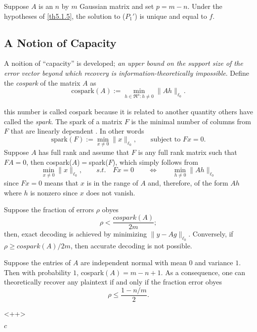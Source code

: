 \begin{corollary}
    \label{cr5.1.6}
    Suppose $A$ is an $n$ by $m$ Gaussian matrix and set $p = m-n$. Under the hypotheses of \cref{th5.1.5}, the solution to ($P_1'$) is unique and equal to $f$.
\end{corollary}

\subsection{A Notion of Capacity}
A noition of ``capacity'' is developed; \emph{\textcolor[rgb]{1,0,0}{an upper bound on the support size of the error vector beyond which recovery is information-theoretically impossible}}. Define the \emph{cospark} of the matrix $A$ as 
\begin{equation}
    \text{cospark}(A) := \min\limits_{h \in \mathfrak{R}^n : h \neq 0} \|Ah\|_{\ell_0}.
    \label{eq5.1.11}
\end{equation}

this number is called cospark because it is related to another quantity others have called the \emph{spark}. The spark of a matrix $F$ is the minimal number of columns from $F$ that are linearly dependent \cite{2-33,2-27}. In other words
\begin{equation*}
    \text{spark}(F) := \min\limits_{x \neq 0}\|x\|_{\ell_0}, \qquad \text{subject to } Fx=0.
\end{equation*}
Suppose $A$ has full rank and assume that $F$ is any full rank matrix such that $FA=0$, then cospark($A$)$=$spark($F$), which simply follows from
\begin{equation*}
    \min\limits_{x \neq 0} \|x\|_{\ell_0}, \qquad s.t. \quad Fx=0 \qquad \Leftrightarrow \qquad \min\limits_{h \neq 0} \|Ah\|_{\ell_0}
\end{equation*}
since $Fx=0$ means that $x$ is in the range of $A$ and, therefore, of the form $Ah$ where $h$ is nonzero since $x$ does not vanish.


\begin{lemma}
    Suppose the fraction of errors $\rho$ obyes
    \begin{equation}
        \rho < \dfrac{cospark(A)}{2m};
        \label{eq5.1.12}
    \end{equation}
    then, exact decoding is achieved by minimizing $\|y-Ag\|_{\ell_0}$. Conversely, if $\rho \geq cospark(A)/2m$, then accurate decoding is not possible.
    \label{lm5.1.7}
\end{lemma}


\begin{corollary}
    \label{cr5.1.8}
    Suppose the entries of $A$ are independent normal with mean $0$ and variance $1$. Then with probability $1$, cospark$(A)=m-n+1$. As a consequence, one can theoretically recover any plaintext if and only if the fraction error obyes
    \begin{equation}
        \rho \leq \dfrac{1-n/m}{2}.
        \label{eq5.1.13}
    \end{equation}
\end{corollary}<++>


$c$


\label{eq5.3.23}





